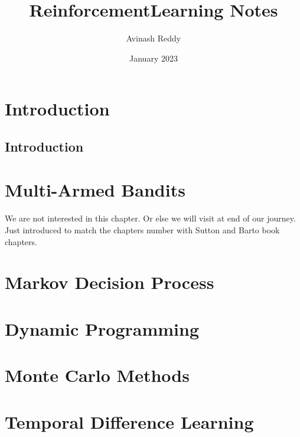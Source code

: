 \documentclass{book}
\title{ReinforcementLearning Notes}
\author{Avinash Reddy}
\date{January 2023}
\begin{document}
\maketitle

\chapter{Introduction}
\section*{Introduction}



\chapter{Multi-Armed Bandits}
We are not interested in this chapter. Or else we will visit at end of our journey. Just introduced to match the chapters number with Sutton and Barto book chapters.

\chapter{Markov Decision Process}


\chapter{Dynamic Programming}


\chapter{Monte Carlo Methods}


\chapter{Temporal Difference Learning}


% 

% 
\end{document}
